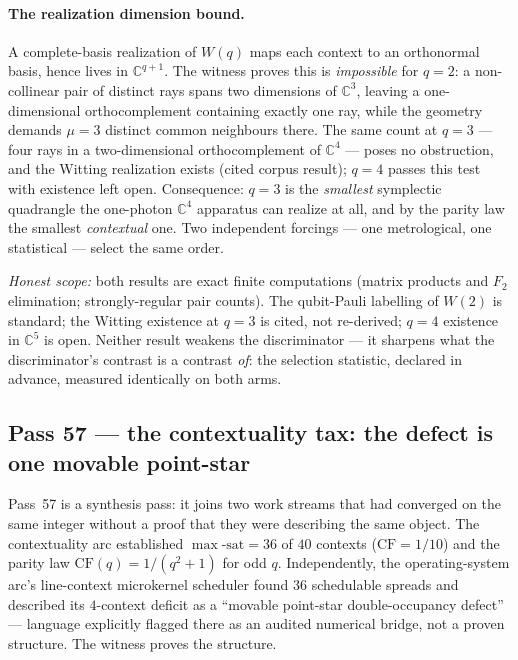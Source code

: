 \documentclass[11pt]{article}
\begin{document}
\paragraph{The realization dimension bound.}  A complete-basis realization of
\(W(q)\) maps each context to an orthonormal basis, hence lives in
\(\mathbb C^{q+1}\).  The witness 
proves this is \emph{impossible} for \(q=2\): a non-collinear pair of distinct
rays spans two dimensions of \(\mathbb C^3\), leaving a one-dimensional
orthocomplement containing exactly one ray, while the geometry demands
\(\mu=3\) distinct common neighbours there.  The same count at \(q=3\) ---
four rays in a two-dimensional orthocomplement of \(\mathbb C^4\) --- poses no
obstruction, and the Witting realization exists (cited corpus result); \(q=4\)
passes this test with existence left open.  Consequence: \(q=3\) is the
\emph{smallest} symplectic quadrangle the one-photon \(\mathbb C^4\) apparatus
can realize at all, and by the parity law the smallest \emph{contextual} one.
Two independent forcings --- one metrological, one statistical --- select the
same order.

\emph{Honest scope:} both results are exact finite computations (matrix
products and \(F_2\) elimination; strongly-regular pair counts).  The
qubit-Pauli labelling of \(W(2)\) is standard; the Witting existence at
\(q=3\) is cited, not re-derived; \(q=4\) existence in \(\mathbb C^5\) is
open.  Neither result weakens the discriminator --- it sharpens what the
discriminator's contrast is a contrast \emph{of}: the selection statistic,
declared in advance, measured identically on both arms.

\subsection{Pass 57 --- the contextuality tax: the defect is one movable point-star}
\label{sec:capstone-fiftyseven}

Pass~57 is a synthesis pass: it joins two work streams that had converged on the
same integer without a proof that they were describing the same object.  The
contextuality arc established \(\max\text{-sat}=36\) of \(40\) contexts
(\(\mathrm{CF}=1/10\)) and the parity law \(\mathrm{CF}(q)=1/(q^2+1)\) for odd
\(q\).  Independently, the operating-system arc's line-context microkernel
scheduler found \(36\) schedulable spreads and described its \(4\)-context
deficit as a ``movable point-star double-occupancy defect'' --- language
explicitly flagged there as an audited numerical bridge, not a proven structure.
The witness  proves the structure.
\end{document}
